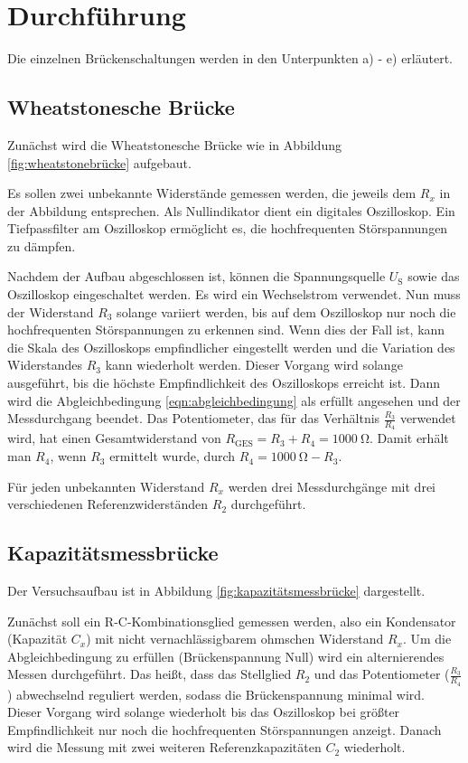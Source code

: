 \section{Durchführung}
\label{sec:Durchführung}

Die einzelnen Brückenschaltungen werden in den Unterpunkten a) - e) erläutert.

\subsection{Wheatstonesche Brücke}
\label{sec:durcha}
Zunächst wird die Wheatstonesche Brücke wie in Abbildung \ref{fig:wheatstonebrücke} aufgebaut.

Es sollen zwei unbekannte Widerstände gemessen werden, die jeweils dem $R_x$ in der Abbildung entsprechen.
Als Nullindikator dient ein digitales Oszilloskop.
Ein Tiefpassfilter am Oszilloskop ermöglicht es, die hochfrequenten Störspannungen zu dämpfen.

Nachdem der Aufbau abgeschlossen ist, können die Spannungsquelle $U_{\text{S}}$ sowie das Oszilloskop eingeschaltet werden.
Es wird ein Wechselstrom verwendet.
Nun muss der Widerstand $R_3$ solange variiert werden, bis auf dem Oszilloskop nur noch die hochfrequenten Störspannungen zu erkennen sind.
Wenn dies der Fall ist, kann die Skala des Oszilloskops empfindlicher eingestellt werden und
die Variation des Widerstandes $R_3$ kann wiederholt werden.
Dieser Vorgang wird solange ausgeführt, bis die höchste Empfindlichkeit des Oszilloskops erreicht ist.
Dann wird die Abgleichbedingung \eqref{eqn:abgleichbedingung} als erfüllt angesehen und der Messdurchgang beendet.
Das Potentiometer, das für das Verhältnis $\frac{R_3}{R_4}$ verwendet wird, hat einen Gesamtwiderstand von $R_{\text{GES}} = R_3 + R_4 = \SI{1000}{\ohm}$.
Damit erhält man $R_4$, wenn $R_3$ ermittelt wurde, durch $R_4 = \SI{1000}{\ohm} - R_3$.

Für jeden unbekannten Widerstand $R_x$ werden drei Messdurchgänge mit drei verschiedenen Referenzwiderständen $R_2$ durchgeführt.

\subsection{Kapazitätsmessbrücke}
\label{sec:durchb}
Der Versuchsaufbau ist in Abbildung \ref{fig:kapazitätsmessbrücke} dargestellt.

Zunächst soll ein R-C-Kombinationsglied gemessen werden, also ein Kondensator (Kapazität $C_x$) mit nicht vernachlässigbarem ohmschen Widerstand $R_x$.
Um die Abgleichbedingung zu erfüllen (Brückenspannung Null) wird ein alternierendes Messen durchgeführt. %
Das heißt, dass das Stellglied $R_2$ und das Potentiometer ($\frac{R_3}{R_4}$) abwechselnd reguliert werden, sodass die Brückenspannung minimal wird.
Dieser Vorgang wird solange wiederholt bis das Oszilloskop bei größter Empfindlichkeit nur noch die hochfrequenten Störspannungen anzeigt.
Danach wird die Messung mit zwei weiteren Referenzkapazitäten $C_2$ wiederholt.


